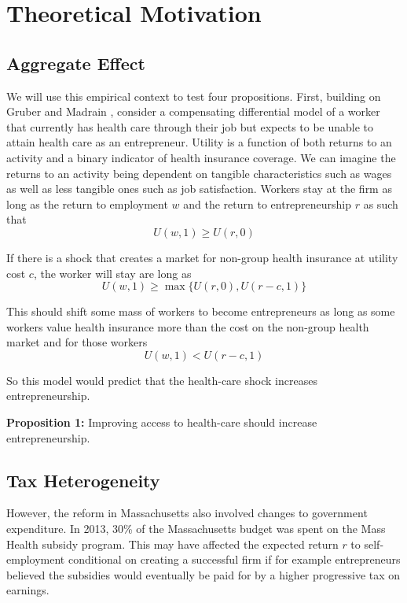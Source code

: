 \chapter{Theoretical Motivation}
\label{sec:model}

\section{Aggregate Effect}

We will use this empirical context to test four propositions. First, building on Gruber and Madrain \cite{gm2002}, consider a compensating differential model of a worker that currently has health care through their job but expects to be unable to attain health care as an entrepreneur. Utility is a function of both returns to an activity and a binary indicator of health insurance coverage. We can imagine the returns to an activity being dependent on tangible characteristics such as wages as well as less tangible ones such as job satisfaction. Workers stay at the firm as long as the return to employment $w$ and the return to entrepreneurship $r$ as such that
$$U(w,1) \ge U(r,0)$$

If there is a shock that creates a market for non-group health insurance at utility cost $c$, the worker will stay are long as
$$U(w,1) \ge \max\{U(r,0),U(r-c,1)\}$$

This should shift some mass of workers to become entrepreneurs as long as some workers value health insurance more than the cost on the non-group health market and for those workers
$$U(w,1) < U(r-c,1)$$

So this model would predict that the health-care shock increases entrepreneurship. 

\textbf{Proposition 1:} 
Improving access to health-care should increase entrepreneurship. 

\section{Tax Heterogeneity}

However, the reform in Massachusetts also involved changes to government expenditure. In 2013, 30\% of the Massachusetts budget was spent on the Mass Health \cite{masshealth} subsidy program. This may have affected the expected return $r$ to self-employment conditional on creating a successful firm if for example entrepreneurs believed the subsidies would eventually be paid for by a higher progressive tax on earnings.

